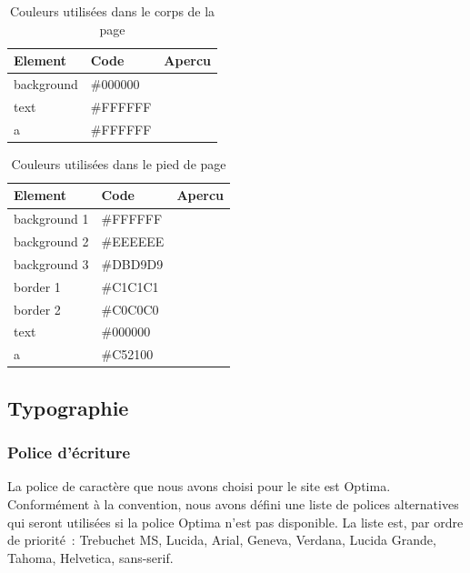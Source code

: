 \documentclass[letter, 11pt]{report}
\begin{document}
\begin{table}[h!tpb]
	\caption{Couleurs utilisées dans le corps de la page}
	\begin{center}
		\begin{tabular}{|l|l|l|}
			\hline
			Element    & Code     & Apercu \\
			\hline
			background & \#000000 & \cellcolor[HTML]{000000} \\ \hline
			text       & \#FFFFFF & \cellcolor[HTML]{FFFFFF} \\ \hline
			a          & \#FFFFFF & \cellcolor[HTML]{FFFFFF} \\ \hline
		\end{tabular}
	\end{center}
\end{table}

\begin{table}[h!tpb]
	\caption{Couleurs utilisées dans le pied de page}
	\begin{center}
		\begin{tabular}{|l|l|l|}
			\hline
			Element      & Code     & Apercu \\
			\hline
			background 1 & \#FFFFFF & \cellcolor[HTML]{FFFFFF} \\ \hline
			background 2 & \#EEEEEE & \cellcolor[HTML]{EEEEEE} \\ \hline
			background 3 & \#DBD9D9 & \cellcolor[HTML]{DBD9D9} \\ \hline
			border 1     & \#C1C1C1 & \cellcolor[HTML]{C1C1C1} \\ \hline
			border 2     & \#C0C0C0 & \cellcolor[HTML]{C0C0C0} \\ \hline
			text         & \#000000 & \cellcolor[HTML]{000000} \\ \hline
			a            & \#C52100 & \cellcolor[HTML]{C52100} \\ \hline
		\end{tabular}
	\end{center}
\end{table}

\subsection{Typographie}

\subsubsection{Police d’écriture}

La police de caractère que nous avons choisi pour le site est Optima. Conformément à la convention, nous avons défini une liste de polices alternatives qui seront utilisées si la police Optima n'est pas disponible. La liste est, par ordre de priorité~: Trebuchet MS, Lucida, Arial, Geneva, Verdana, Lucida Grande, Tahoma, Helvetica, sans-serif.
\end{document}
